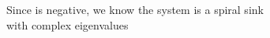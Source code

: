 \documentclass[preview]{standalone}
\begin{document}
\begin{center}
\raggedright
                Since \Delta is negative, we know the system is a spiral sink \\
                with complex eigenvalues
\end{center}
\end{document}
